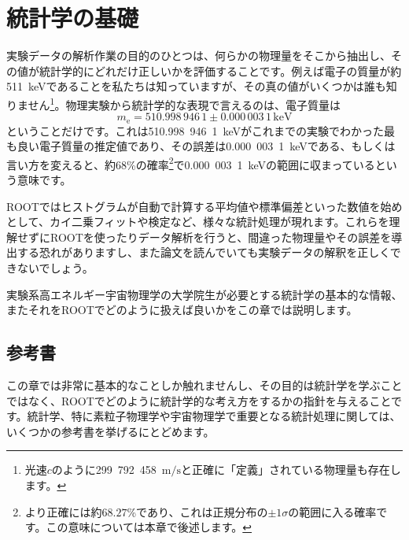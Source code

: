 \chapter{統計学の基礎}
\label{chap_Statistics}

実験データの解析作業の目的のひとつは、何らかの物理量をそこから抽出し、その値が統計学的にどれだけ正しいかを評価することです。例えば電子の質量が約511~keVであることを私たちは知っていますが、その真の値がいくつかは誰も知りません\footnote{光速$c$のように299~792~458~$\mathrm{m}/\mathrm{s}$と正確に「定義」されている物理量も存在します。}。物理実験から統計学的な表現で言えるのは、電子質量は
\begin{equation}
  m_\mathrm{e} = 510.998\,946\,1\pm0.000\,003\,1\,\mathrm{keV}
\end{equation}
ということだけです\cite{Patrignani:2016:Review-of-Particle-Physics}。これは510.998~946~1~keVがこれまでの実験でわかった最も良い電子質量の推定値であり、その誤差は0.000~003~1~keVである、もしくは言い方を変えると、約68\%の確率\footnote{より正確には約$68.27$\%であり、これは正規分布の$\pm1\sigma$の範囲に入る確率です。この意味については本章で後述します。}で0.000~003~1~keVの範囲に収まっているという意味です。

ROOTではヒストグラムが自動で計算する平均値や標準偏差といった数値を始めとして、カイ二乗フィットや検定など、様々な統計処理が現れます。これらを理解せずにROOTを使ったりデータ解析を行うと、間違った物理量やその誤差を導出する恐れがありますし、また論文を読んでいても実験データの解釈を正しくできないでしょう。

実験系高エネルギー宇宙物理学の大学院生が必要とする統計学の基本的な情報、またそれをROOTでどのように扱えば良いかをこの章では説明します。

\section{参考書}

この章では非常に基本的なことしか触れませんし、その目的は統計学を学ぶことではなく、ROOTでどのように統計学的な考え方をするかの指針を与えることです。統計学、特に素粒子物理学や宇宙物理学で重要となる統計処理に関しては、いくつかの参考書を挙げるにとどめます。

